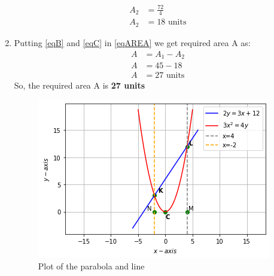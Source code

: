 \documentclass[journal,12pt,twocolumn]{IEEEtran}
\begin{document}
\begin{enumerate}
\begin{align}
    \\
    A_2&= \frac{72}{4} 
    \\
    A_2&= 18 \text{ units} \label{eqC}
\end{align}
\item Putting \eqref{eqB} and \eqref{eqC} in \eqref{eqAREA} we get required area A as:
\begin{align}
 A &= A_1 -A_2 
 \\
 A &= 45-18
 \\
 A &= 27 \text{ units}
\end{align}
So, the required area A is \textbf{27 units}
\begin{figure}[ht]
\centering
\includegraphics[width=\columnwidth]{Parabola-Line.png}
\caption{Plot of the parabola and line}
\label{Plot of the Parabola and line}
\end{figure}
\end{enumerate}
\end{document}
